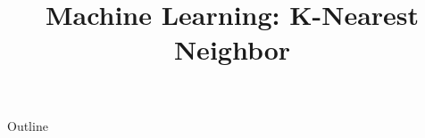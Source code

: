 \documentclass[xcolor=dvipsnames,compress,t,pdf,9pt]{beamer}
\title[\insertframenumber /\inserttotalframenumber]{Machine Learning: K-Nearest Neighbor}
\begin{document}
	\begin{frame}
	\titlepage
	\end{frame}

	\begin{frame}{Outline}
	    \tableofcontents
	\end{frame}

	
	
	
\end{document}
